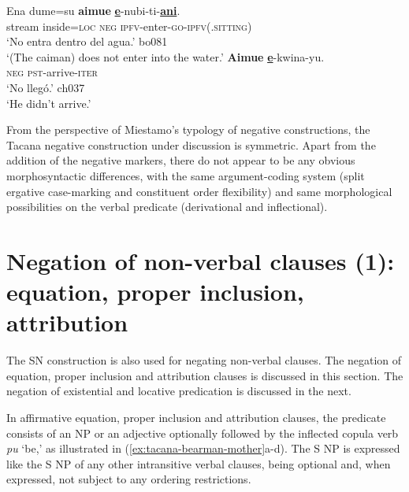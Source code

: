 \documentclass[output=paper,draft,draftmode,colorlinks,citecolor=brown]{langscibook}
\begin{document}
\begin{exe}\ex\label{ex:tacana-caiman-second}
\gll {\ob}Ena  dume=su{\cb}  \textbf{aimue}
\textbf{\uline{e}}-nubi-ti-\textbf{\uline{ani}}.\\
    stream  inside=\textsc{loc}  \textsc{neg}
    \textsc{ipfv}-enter-\textsc{go-ipfv(.sitting)}\\
\glt `No entra dentro del agua.' bo081\\
`(The caiman) does not enter into the water.'
\ex\label{ex:tacana-arrive} 
\gll \textbf{Aimue}  \textbf{\uline{e}}-kwina-yu.\\
 \textsc{neg}  \textsc{pst}-arrive-\textsc{iter}\\
\glt `No llegó.' ch037\\ 
`He didn't arrive.'
\end{exe}

From the perspective of Miestamo's \parencites*{Miestamo2005}{Miestamo2007} typology of negative constructions, the Tacana negative construction under discussion is symmetric. Apart from the addition of the negative markers, there do not appear to be any obvious morphosyntactic differences, with the same argument-coding system (split ergative case-marking and constituent order flexibility) and same morphological possibilities on the verbal predicate (derivational and inflectional). 

\section{Negation of non-verbal clauses (1): equation, proper inclusion, attribution}
\label{sec:tacana-4}

The SN construction is also used for negating non-verbal clauses. The
negation of equation, proper inclusion and attribution clauses is discussed
in this section. The negation of existential and locative predication is discussed in the next.

In affirmative equation, proper inclusion and attribution clauses, the
predicate consists of an NP or an adjective optionally followed by
the inflected copula verb \textit{pu} `be,' as illustrated in
(\ref{ex:tacana-bearman-mother}a-d). The S NP is expressed like the S NP of any other intransitive verbal clauses, being optional and, when expressed, not subject to any ordering restrictions.
\end{document}
